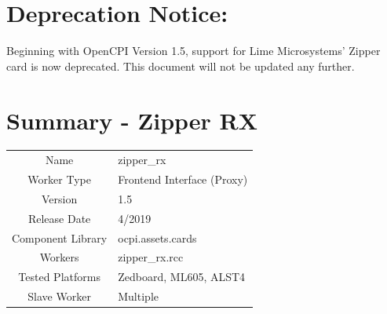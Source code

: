 \documentclass{article}
\author{} %
\date{Version \docVersion} %
\title{\docTitle}
\def\docVersion{1.5}
\def\comp{zipper\_rx}
\def\Comp{Zipper RX}
\begin{document}
\section*{Deprecation Notice:}
Beginning with OpenCPI Version 1.5, support for Lime Microsystems' Zipper card is now deprecated. This document will not be updated any further.

\section*{Summary - \Comp}
\begin{tabular}{|c|M{13.5cm}|}
	\hline
	                  &                                        \\
	\hline
	Name              & \comp                                  \\
	\hline
	Worker Type       & Frontend Interface (Proxy)             \\
	\hline
	Version           & \docVersion \\
	\hline
	Release Date      & 4/2019 \\
	\hline
	Component Library & ocpi.assets.cards \\
	\hline
	Workers           & zipper\_rx.rcc                      \\
	\hline
	Tested Platforms  & Zedboard, ML605, ALST4                      \\
	\hline
	Slave Worker      & Multiple                               \\
	\hline
\end{tabular}
\end{document}
